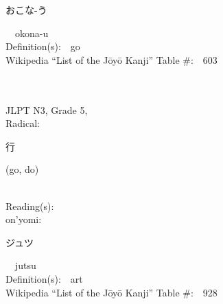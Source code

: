 \begin{multicols}{2}
{\hspace*{2em}}{\begin{CJK}{UTF8}{min} おこな-う \end{CJK}}\ \ okona-u\ \ \\
Definition(s):\ \ go \\
Wikipedia ``List of the J\=oy\=o Kanji'' Table \#:\ \ 603 \\
\ \ \\
{\fontsize{34pt}{40pt}  }\ \ \\  %
{JLPT N3, Grade 5, \\Radical:\ \ {\begin{CJK}{UTF8}{min} 行 \end{CJK}} (go, do) } \\
Reading(s):\ \ \\
{\hspace*{1em}}on'yomi:\ \ \\
{\hspace*{2em}}{\begin{CJK}{UTF8}{min} ジュツ \end{CJK}}\ \ jutsu\ \ \\
Definition(s):\ \ art \\
Wikipedia ``List of the J\=oy\=o Kanji'' Table \#:\ \ 928 \\
\ \ \\
\end{multicols}



